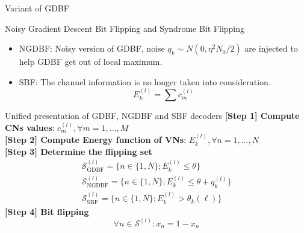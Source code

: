 \documentclass[aspectratio=169,8pt]{beamer}
\begin{document}
\begin{frame}{Variant of GDBF}
  \vspace{-0.3cm}
  \begin{block}{Noisy Gradient Descent Bit Flipping and Syndrome Bit Flipping}
    \begin{itemize}
      \item \alert{NGDBF}: Noisy version of GDBF, noise \(q_k \sim N(0,\eta^2 N_0/2)\) are injected to help GDBF get out of local maximum.
      \item \alert{SBF}: The channel information is \alert{no longer} taken into consideration.
      \begin{equation*}
        E_{k}^{(l)} = \sum c_m^{(l)}
      \end{equation*}
    \end{itemize}

  \end{block}

  \vspace{-0.2cm}
  \begin{block}{Unified presentation of GDBF, NGDBF and SBF decoders}
    \textbf{[Step 1] Compute CNs values}: \(c_m^{(l)},\forall m=1,\ldots,M\) \\
    \textbf{[Step 2] Compute Energy function of VNs}: \(E_{k}^{(l)},\forall n=1,\ldots,N\)\\
    \textbf{[Step 3] Determine the flipping set}
    \begin{gather*}
      \mathcal{S}_{\text{GDBF}}^{(l)} = \{n\in\{1,N\};E_k^{(l)}\le \theta \} \\ 
      \mathcal{S}_{\text{NGDBF}}^{(l)} = \{n\in\{1,N\};E_k^{(l)}\le \theta + q_k^{(l)} \}\\ 
      \mathcal{S}_{\text{SBF}}^{(l)} = \{n\in\{1,N\};E_k^{(l)} > \theta_k(\ell) \} 
    \end{gather*}
    \textbf{[Step 4] Bit flipping}
    \begin{equation*}
      \forall n \in \mathcal{S}^{(l)}:  x_n = 1-x_n
    \end{equation*}
  \end{block}
\end{frame}
\end{document}
